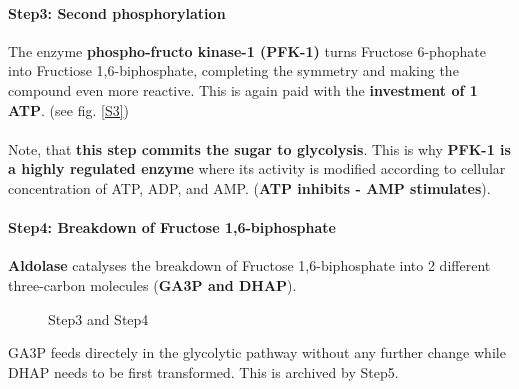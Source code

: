 \documentclass[../main.tex]{subfiles}
\begin{document}
\paragraph{Step3: Second phosphorylation}
The enzyme \textbf{phospho-fructo kinase-1 (PFK-1)} turns Fructose 6-phophate into Fructiose 1,6-biphosphate, completing the symmetry and making the compound even more reactive. This is again paid with the \textbf{investment of 1 ATP}. (see fig. \ref{S3})\\
\\
Note, that \textbf{this step commits the sugar to glycolysis}. This is why \textbf{PFK-1 is a highly regulated enzyme} where its activity is modified according to cellular concentration of ATP, ADP, and AMP. (\textbf{ATP inhibits - AMP stimulates}). 

\paragraph{Step4: Breakdown of Fructose 1,6-biphosphate}
\textbf{Aldolase} catalyses the breakdown of Fructose 1,6-biphosphate into 2 different three-carbon molecules (\textbf{GA3P and DHAP}). 
\begin{figure}[h!]
	\centering
	\caption{Step3 and Step4}
\end{figure}
GA3P feeds directely in the glycolytic pathway without any further change while DHAP needs to be first transformed.  This is archived by Step5. 
\end{document}
